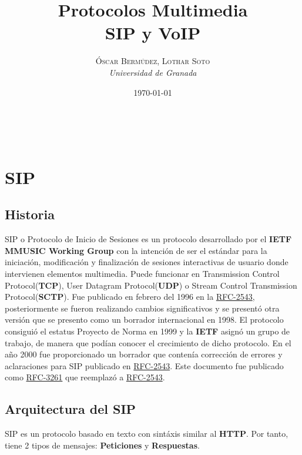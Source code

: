 \documentclass[a4paper, 11pt]{article} %
\title{\textbf{Protocolos Multimedia}\\ %
\vspace{20 pt}
SIP y VoIP} %
\author{\textsc{Óscar Bermúdez, Lothar Soto} %
\\{\textit{Universidad de Granada}}} %
\date{\today} %
\makeatletter
\newcommand{\RFC}[1]{\href{https://www.ietf.org/rfc/rfc#1.txt}{RFC-#1}}
\renewcommand{\maketitle}{ %
\begin{center} %
{\Huge\@title} %
\end{center}

\vspace{20pt} %

\begin{flushright} %
{\large\@author} %
\\\@date %

\vspace{40pt} %
\end{flushright}
}
\makeatother
\begin{document}
\maketitle %

{\parskip=2pt
\tableofcontents
}
\pagebreak

\section{SIP}
	\subsection{Historia}
	SIP o Protocolo de Inicio de Sesiones es un protocolo desarrollado por el \textbf{IETF MMUSIC Working Group} con la intención de ser el estándar para la iniciación, modificación y finalización de sesiones interactivas de usuario donde intervienen elementos multimedia. Puede funcionar en Transmission Control Protocol(\textbf{TCP}), User Datagram Protocol(\textbf{UDP}) o Stream Control Transmission Protocol(\textbf{SCTP}). Fue publicado en febrero del 1996 en la \RFC{2543}, posteriormente se fueron realizando cambios significativos y se presentó otra versión que se presento como un borrador internacional en 1998. El protocolo consiguió el estatus Proyecto de Norma en 1999 y la \textbf{IETF} asignó un grupo de trabajo, de manera que podían conocer el crecimiento de dicho protocolo. En el año 2000 fue proporcionado un borrador que contenía corrección de errores y aclaraciones para SIP publicado en \RFC{2543}. Este documento fue publicado como \RFC{3261} que reemplazó a \RFC{2543}.\\
	
	\subsection{Arquitectura del SIP}
	SIP es un protocolo basado en texto con sintáxis similar al \textbf{HTTP}. Por tanto, tiene 2 tipos de mensajes: \textbf{Peticiones} y \textbf{Respuestas}.
\end{document}
